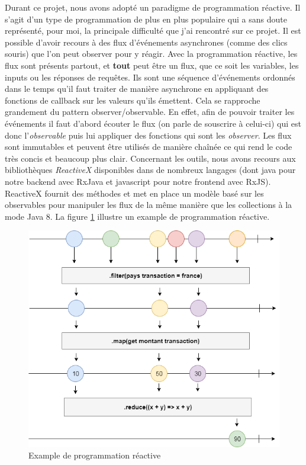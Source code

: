 	Durant ce projet, nous avons adopté un paradigme de programmation réactive. Il s'agit d'un type de programmation de plus en plus populaire qui a sans doute représenté, pour moi, la principale difficulté que j'ai rencontré sur ce projet. Il est possible d'avoir recours à des flux d'événements asynchrones (comme des clics souris) que l'on peut observer pour y réagir. Avec la programmation réactive, les flux sont présents partout, et \textbf{tout} peut être un flux, que ce soit les variables, les inputs ou les réponses de requêtes. Ils sont une séquence d'événements ordonnés dans le temps qu'il faut traiter de manière asynchrone en appliquant des fonctions de callback sur les valeurs qu'ils émettent. Cela se rapproche grandement du pattern observer/observable. En effet, afin de pouvoir traiter les événements il faut d'abord écouter le flux (on parle de souscrire à celui-ci) qui est donc l'\textit{observable} puis lui appliquer des fonctions qui sont les \textit{observer}. Les flux sont immutables et peuvent être utilisés de manière chaînée ce qui rend le code très concis et beaucoup plus clair. Concernant les outils, nous avons recours aux bibliothèques \textit{ReactiveX} disponibles dans de nombreux langages (dont java pour notre backend avec RxJava et javascript pour notre frontend avec RxJS). ReactiveX fournit des méthodes et met en place un modèle basé sur les observables pour manipuler les flux de la même manière que les collections à la mode Java 8. La figure \ref{reactivex} illustre un example de programmation réactive.
	
\begin{figure}[h!]
	\includegraphics[scale=0.50]{images/travailBP1818/architecture/reactivex.png}
	\centering
	\caption{Example de programmation réactive}
	\label{reactivex}
\end{figure}

